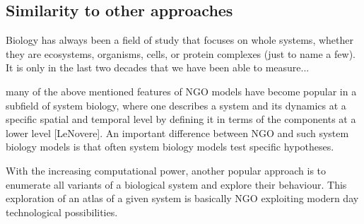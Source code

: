 \subsection{Similarity to other approaches}

Biology has always been a field of study that focuses on whole systems, whether they are ecosystems, organisms, cells, or protein complexes (just to name a few). It is only in the last two decades that we have been able to measure...


many of the above mentioned features of NGO models have become popular in a subfield of system biology, where one describes a system and its dynamics at a specific spatial and temporal level by defining it in terms of the components at a lower level [LeNovere]. An important difference between NGO and such system biology models is that often system biology models test specific hypotheses. 

With the increasing computational power, another popular approach is to enumerate all variants of a biological system and explore their behaviour. This exploration of an atlas of a given system is basically NGO exploiting modern day technological possibilities.

